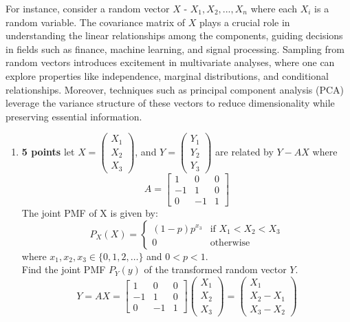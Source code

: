 \documentclass[a3paper,12pt]{extarticle} %
\begin{document}
For instance, consider a random vector \(X\) - \(X_1, X_2,...,X_n\) where each \(X_i\) is a random variable. The covariance matrix of \(X\) plays a crucial role in understanding the linear relationships among the
components, guiding decisions in fields such as finance, machine learning, and signal processing.
Sampling from random vectors introduces excitement in multivariate analyses, where one can explore
properties like independence, marginal distributions, and conditional relationships. Moreover, techniques
such as principal component analysis (PCA) leverage the variance structure of these vectors to reduce
dimensionality while preserving essential information.
\begin{enumerate}
    \item \textbf{5 points} let \(X = \begin{pmatrix}X_1\\X_2 \\X_3\end{pmatrix}\), and \(Y = \begin{pmatrix}Y_1\\Y_2 \\Y_3\end{pmatrix}\)  are related by \(Y - AX\) where
    \[A = \begin{bmatrix}1 & 0 & 0\\-1 & 1 & 0\\0 & -1 & 1\end{bmatrix}\]
    The joint PMF of X is given by:
    \[
    P_X(X) =  
    \begin{cases} 
    (1-p)p^{x_3} & \text{if } X_1 < X_2 < X_3 \\
    0 & \text{otherwise}
    \end{cases}
    \]
    where \(x_1, x_2, x_3 \in \{0, 1, 2, \ldots\}\) and \(0 < p < 1\).
    \\ Find the joint PMF \(P_Y(y)\) of the transformed random vector \(Y\).
    \[
    Y = AX = \begin{bmatrix}1 & 0 & 0\\-1 & 1 & 0\\0 & -1 & 1\end{bmatrix} \begin{pmatrix}X_1\\X_2 \\X_3\end{pmatrix} = \begin{pmatrix}X_1\\X_2 - X_1 \\X_3 - X_2\end{pmatrix}
\]
\end{enumerate}
\end{document}

